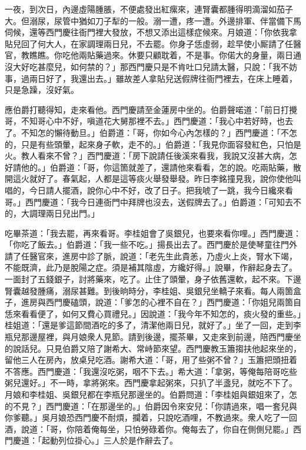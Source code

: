 一夜，到次日，內邊虛陽腫脹，不便處發出紅瘰來，連腎囊都腫得明滴溜如茄子大。但溺尿，尿管中猶如刀子犁的一般。溺一遭，疼一遭。外邊排軍、伴當備下馬伺候，還等西門慶往衙門裡大發放，不想又添出這樣症候來。月娘道：「你依我拿貼兒回了何大人，在家調理兩日兒，不去罷。你身子恁虛弱，趁早使小厮請了任醫官，教瞧瞧。你吃他兩貼藥過來。休要只顧耽着，不是事。你偌大的身量，兩日通沒大好吃甚麼兒，如何禁的？」那西門慶只是不肯吐口兒請太醫，只說：「我不妨事，過兩日好了，我還出去。」雖故差人拿貼兒送假牌往衙門裡去，在床上睡着，只是急躁，沒好氣。

應伯爵打聽得知，走來看他。西門慶請至金蓮房中坐的。伯爵聲喏道：「前日打攪哥，不知哥心中不好，嗔道花大舅那裡不去。」西門慶道：「我心中若好時，也去了。不知怎的懶待動旦。」伯爵道：「哥，你如今心內怎樣的？」西門慶道：「不怎的，只是有些頭暈，起來身子軟，走不的。」伯爵道：「我見你面容發紅色，只怕是火。教人看來不曾？」西門慶道：「房下說請任後溪來看我，我說又沒甚大病，怎好請他的。」伯爵道：「哥，你這箇就差了，還請他來看看，怎的說。吃兩貼藥，散開這火就好了。春氣起，人都是這等痰火舉發舉發。昨日李銘撞見我，說你使他叫唱的，今日請人擺酒，說你心中不好，改了日子。把我唬了一跳，我今日纔來看哥。」西門慶道：「我今日連衙門中拜牌也沒去，送假牌去了。」伯爵道：「可知去不的，大調理兩日兒出門。」

吃畢茶道：「我去罷，再來看哥。李桂姐會了吳銀兒，也要來看你哩。」西門慶道：「你吃了飯去。」伯爵道：「我一些不吃。」揚長出去了。西門慶於是使琴童往門外請了任醫官來，進房中診了脈，說道：「老先生此貴恙，乃虛火上炎，腎水下竭，不能既濟，此乃是脫陽之症。須是補其陰虛，方纔好得。」{}說畢，作辭起身去了。一面封了五錢銀子，討將藥來，吃了。止住了頭暈，{}身子依舊還軟，起不來。下邊腎囊越發腫痛，溺尿甚難。到後晌時分，李桂姐、吳銀兒坐轎子來看。每人兩箇盒子，進房與西門慶磕頭，說道：「爹怎的心裡不自在？」西門慶道：「你姐兒兩箇自恁來看看便了，如何又費心買禮兒。」因說道：「我今年不知怎的，痰火發的重些。」桂姐道：「還是爹這節間酒吃的多了，清潔他兩日兒，就好了。」坐了一回，走到李瓶兒那邊屋裡，與月娘衆人見節。請到後邊，擺茶畢，又走來到前邊，陪西門慶坐的說話兒。只見伯爵又陪了謝希大、常峙節來望。西門慶教玉簫搊扶他起來坐的，留他三人在房內，放桌兒吃酒。謝希大道：「哥，用了些粥不曾？」玉簫把頭扭着不答應。西門慶道：「我還沒吃粥，咽不下去。」希大道：「拿粥，等俺每陪哥吃些粥兒還好。」不一時，拿將粥來。西門慶拿起粥來，只扒了半盞兒，就吃不下了。月娘和李桂姐、吳銀兒都在李瓶兒那邊坐的。伯爵問道：「李桂姐與銀姐來了，怎的不見？」西門慶道：「在那邊坐的。」伯爵因令來安兒：「你請過來，唱一套兒與你爹聽。」吳月娘恐西門慶不耐煩，攔着，只說吃酒哩，不教過來。衆人吃了一回酒，說道：「哥，你陪着俺每坐，只怕勞碌着你。俺每去了，你自在側側兒罷。」西門慶道：「起動列位掛心。」三人於是作辭去了。

